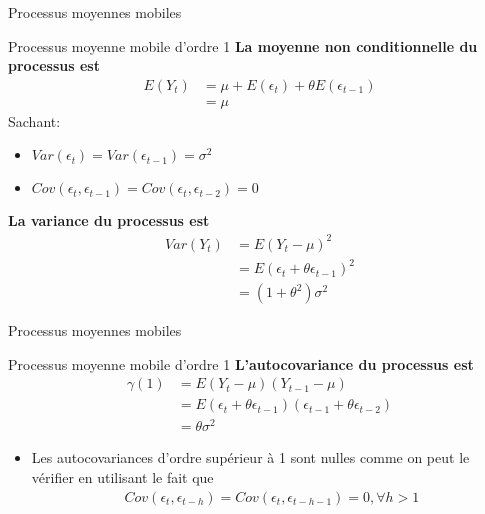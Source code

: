 \documentclass{beamer}
\begin{document}
\begin{frame}{Processus moyennes mobiles}
\begin{block}{Processus moyenne mobile d’ordre 1}
\textbf{La moyenne non conditionnelle du processus est}
\begin{align*}
E(Y_t)&=\mu+E(\epsilon_t)+\theta E(\epsilon_{t-1})\\ & = \mu
\end{align*}
Sachant:
\begin{itemize}
\item $Var(\epsilon_t)=Var(\epsilon_{t-1})=\sigma^2$
\item $Cov(\epsilon_t,\epsilon_{t-1})=Cov(\epsilon_t,\epsilon_{t-2})=0$
\end{itemize}
\textbf{La variance du processus est}
\begin{align*}
Var(Y_t)&=E(Y_t-\mu)^2 \\& = E(\epsilon_t+\theta \epsilon_{t-1})^2 \\ & = (1+\theta^2)\sigma^2
\end{align*}
\end{block}
\end{frame}

\begin{frame}{Processus moyennes mobiles}
\begin{block}{Processus moyenne mobile d’ordre 1}
\textbf{L’autocovariance du processus est}
\begin{align*}
\gamma(1)&=E(Y_t-\mu)(Y_{t-1}-\mu)\\ & =E(\epsilon_t+\theta \epsilon_{t-1})(\epsilon_{t-1}+\theta \epsilon_{t-2})\\ & = \theta \sigma^2
\end{align*}
\begin{itemize}
\item Les autocovariances d’ordre supérieur à 1 sont nulles comme on peut le vérifier en utilisant le fait que
\begin{align*}
Cov(\epsilon_t,\epsilon_{t-h})=Cov(\epsilon_t,\epsilon_{t-h-1})=0, \forall h >1
\end{align*}

\end{itemize}
\end{block}
\end{frame}
\end{document}

